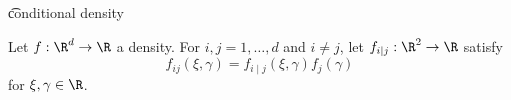 


\t{conditional density}


Let $f: \R^d \to \R$ a density.
For $i, j = 1, \dots, d$ and
$i \neq j$,
let $f_{i \mid j}: \R^2 \to \R$
satisfy
\[
f_{ij}(\xi, \gamma) = f_{i \mid j}(\xi, \gamma)f_j(\gamma)
\]
for $\xi, \gamma \in \R$.

\blankpage
